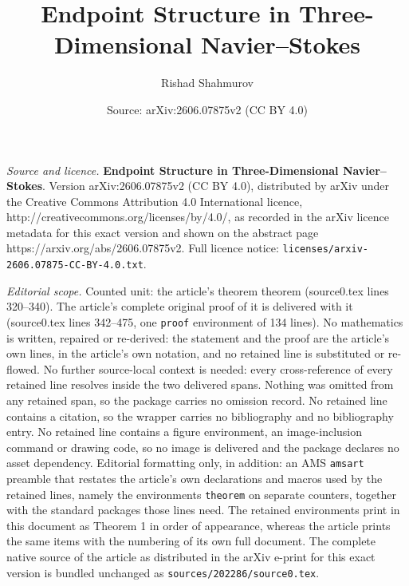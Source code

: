 \documentclass[10pt,a4paper]{amsart}
\title{\textbf{Endpoint Structure in Three-Dimensional Navier--Stokes}}
\author{Rishad Shahmurov}
\date{Source: arXiv:2606.07875v2 (CC BY 4.0)}
\begin{document}
\maketitle

\noindent\emph{Source and licence.} \textbf{Endpoint Structure in Three-Dimensional Navier--Stokes}. Version arXiv:2606.07875v2 (CC BY 4.0), distributed by arXiv under the Creative Commons Attribution 4.0 International licence, http://creativecommons.org/licenses/by/4.0/, as recorded in the arXiv licence metadata for this exact version and shown on the abstract page https://arxiv.org/abs/2606.07875v2. Full licence notice: \texttt{licenses/arxiv-2606.07875-CC-BY-4.0.txt}.\par\smallskip

\noindent\textit{Editorial scope.} Counted unit: the article's theorem theorem (source0.tex lines 320--340). The article's complete original proof of it is delivered with it (source0.tex lines 342--475, one \texttt{proof} environment of 134 lines). No mathematics is written, repaired or re-derived: the statement and the proof are the article's own lines, in the article's own notation, and no retained line is substituted or re-flowed.  No further source-local context is needed: every cross-reference of every retained line resolves inside the two delivered spans.  Nothing was omitted from any retained span, so the package carries no omission record.  No retained line contains a citation, so the wrapper carries no bibliography and no bibliography entry.  No retained line contains a figure environment, an image-inclusion command or drawing code, so no image is delivered and the package declares no asset dependency.  Editorial formatting only, in addition: an AMS \texttt{amsart} preamble that restates the article's own declarations and macros used by the retained lines, namely the environments \texttt{theorem} on separate counters, together with the standard packages those lines need.  The retained environments print in this document as Theorem 1 in order of appearance, whereas the article prints the same items with the numbering of its own full document.  The complete native source of the article as distributed in the arXiv e-print for this exact version is bundled unchanged as \texttt{sources/202286/source0.tex}.
\end{document}
